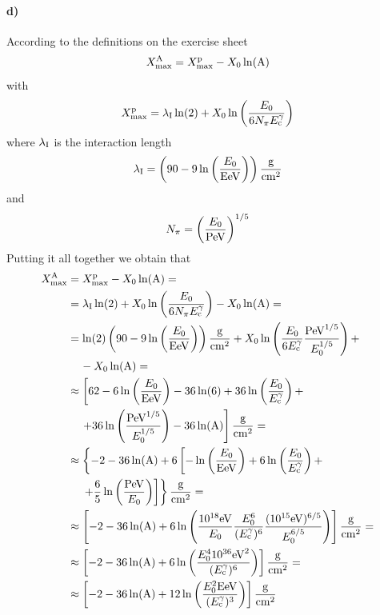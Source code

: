 \documentclass{article}
\begin{document}
\paragraph{d)}
According to the definitions on the exercise sheet
\begin{align}
X_{\rm max}^{\rm A}=X_{\rm max}^{\rm p}-X_0\ln({\rm A})
\end{align}
with 
\begin{align}
X_{\rm max}^{\rm p}=\lambda_{\rm I}\ln(2)+X_0 \ln\left(\frac{E_0}{6N_\pi E_{\rm c}^{\gamma}}\right)
\end{align}
where $\lambda_{\rm I}$ is the interaction length
\begin{align}
\lambda_{\rm I}=\left(90-9\ln\left(\frac{E_0}{{\rm EeV}}\right)\right)\frac{{\rm g}}{{\rm cm}^2}
\end{align}
and 
\begin{align}
N_\pi=\left(\frac{E_0}{{\rm PeV}}\right)^{1/5}
\end{align}
Putting it all together we obtain that
\begin{align}
\nonumber
X_{\rm max}^{\rm A} & =X_{\rm max}^{\rm p}-X_0\ln({\rm A})= \\
\nonumber
& = \lambda_{\rm I}\ln(2)+X_0 \ln\left(\frac{E_0}{6N_\pi E_{\rm c}^{\gamma}}\right)-X_0\ln({\rm A})= \\
\nonumber
& = \ln(2)\left(90-9\ln\left(\frac{E_0}{{\rm EeV}}\right)\right)\frac{{\rm g}}{{\rm cm}^2}+X_0 \ln\left(\frac{E_0}{6 E_{\rm c}^{\gamma}}\frac{{\rm PeV}^{1/5}}{E_{0}^{1/5}}\right)+ \\ & \nonumber \hspace{0.4 cm}-X_0\ln({\rm A})= \\
\nonumber
& \approx \left[62-6\ln\left(\frac{E_0}{{\rm EeV}}\right)-36\ln(6)+36\ln\left(\frac{E_0}{E_{\rm c}^{\gamma}}\right)+\right. \\ & \nonumber \hspace{0.4 cm}\left.+36\ln\left(\frac{{\rm PeV}^{1/5}}{E_{0}^{1/5}}\right)-36\ln({\rm A})\right]\frac{{\rm g}}{{\rm cm}^2} =\\
\nonumber
& \approx \left\{-2-36\ln({\rm A})+6\left[-\ln\left(\frac{E_0}{{\rm EeV}}\right)+6\ln\left(\frac{E_0}{E_{\rm c}^{\gamma}}\right)+\right.\right. \\ & \nonumber \hspace{0.4 cm}\left.\left.+\frac{6}{5}\ln\left(\frac{{\rm PeV}}{E_{0}}\right)\right]\right\}\frac{{\rm g}}{{\rm cm}^2}=\\
\nonumber
& \approx \left[-2-36\ln({\rm A})+6\ln\left(\frac{10^{18}{\rm eV}}{E_0}\frac{E_{0}^{6}}{(E_{\rm c}^{\gamma})^6}\frac{(10^{15}{\rm eV})^{6/5}}{E_{0}^{6/5}}\right)\right]\frac{{\rm g}}{{\rm cm}^2}=\\
\nonumber
& \approx \left[-2-36\ln({\rm A})+6\ln\left(\frac{E_{0}^{4}10^{36}{\rm eV}^2}{(E_{\rm c}^{\gamma})^6}\right)\right]\frac{{\rm g}}{{\rm cm}^2}=\\
\nonumber
& \approx \left[-2-36\ln({\rm A})+12\ln\left(\frac{E_{0}^{2}{\rm EeV}}{(E_{\rm c}^{\gamma})^3}\right)\right]\frac{{\rm g}}{{\rm cm}^2}
\end{align}
\end{document}
